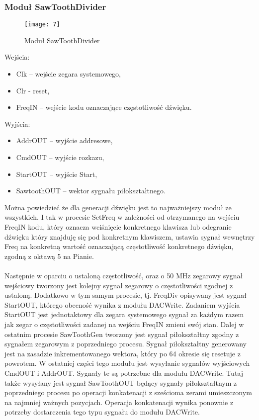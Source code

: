 \documentclass[11pt]{article}
\begin{document}
	\subsubsection{Moduł SawToothDivider}

	\begin{figure}[h]
		\centering
		\texttt{[image: 7]}
		\caption{Moduł SawToothDivider}
		\label{fig:7}
	\end{figure}
	
	\newpage
	

	Wejścia:
	\begin{itemize}[noitemsep]
	\item Clk – wejście zegara systemowego,
	\item Clr - reset,
	\item FreqIN – wejście kodu oznaczające częstotliwość dźwięku.
	\end{itemize}
	Wyjścia:
	\begin{itemize}[noitemsep]
	\item AddrOUT – wyjście addresowe,
	\item CmdOUT – wyjście rozkazu,
	\item StartOUT – wyjście Start,
	\item SawtoothOUT – wektor sygnału piłokształtnego.
	\end{itemize}

	Można powiedzieć że dla generacji dźwięku jest to najważniejszy moduł ze wszystkich. I tak w procesie SetFreq w zależności od otrzymanego na wejściu FreqIN kodu, który oznacza wciśnięcie konkretnego klawisza lub odegranie dźwięku który znajduję się pod konkretnym klawiszem, ustawia sygnał wewnętrzy Freq na konkretną wartość oznaczającą częstotliwość konkretnego dźwięku, zgodną z oktawą 5 na Pianie. \cite{4} \\\\Następnie w oparciu o ustaloną częstotliwość, oraz o 50 MHz zegarowy sygnał wejściowy tworzony jest kolejny sygnał zegarowy  o częstotliwości zgodnej z ustaloną. Dodatkowo w tym samym procesie, tj. FreqDiv opisywany jest sygnał StartOUT, którego obecność wynika z modułu DACWrite. Zadaniem wyjścia StartOUT jest jednotaktowy dla zegara systemowego sygnał za każdym razem jak zegar o częstotliwości zadanej na wejściu FreqIN zmieni swój stan. Dalej w ostatnim procesie SawToothGen tworzony jest sygnał piłokształtny zgodny z sygnałem zegarowym z poprzedniego procesu. Sygnał piłokształtny generowany jest na zasadzie inkrementowanego wektora, który po 64 okresie się resetuje z powrotem. W ostatniej części tego modułu jest wysyłanie sygnałów wyjściowych CmdOUT i AddrOUT. Sygnały te są potrzebne dla modułu DACWrite. Tutaj także wysyłany jest sygnał SawToothOUT będący sygnały piłokształtnym z poprzedniego procesu po operacji konkatenacji z sześcioma zerami umieszczonym na najmniej ważnych pozycjach. Operacja konkatenacji wynika ponownie z potrzeby dostarczenia tego typu sygnału do modułu DACWrite.
	
\end{document}
